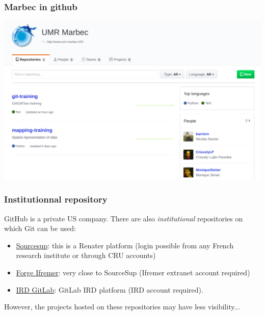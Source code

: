 \documentclass[svgnames]{beamer}
\begin{document}
\begin{frame}
\frametitle{Marbec in github}

\begin{center}
\includegraphics[scale=0.25]{img/github_marbec.png}
\end{center}  
\end{frame}

\begin{frame}
    \frametitle{Institutionnal repository}

    GitHub is a private US company. There are also \emph{institutional} repositories on which Git can be used:

    \begin{itemize}
        \item{\href{https://sourcesup.renater.fr/}{Sourcesup}: this is a Renater platform (login possible from any French research institute or through CRU accounts)}
        \item{\href{https://forge.ifremer.fr/}{Forge Ifremer}: very close to SourceSup (Ifremer extranet account required)}
        \item{\href{gitlab.intranet.ird.fr}{IRD GitLab}: GitLab IRD platform (IRD account required).}
    \end{itemize}

    However, the projects hosted on these repositories may have less visibility...

\end{frame}
\end{document}
